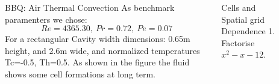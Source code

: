 \documentclass[final]{beamer}
\newlength{\sepwid}
\newlength{\onecolwid}
\newlength{\twocolwid}
\begin{document}
\begin{frame}[t]
\begin{columns}[t]
\begin{column}{\onecolwid}
\end{column} %

\begin{column}{\sepwid}\end{column} %

\begin{column}{\twocolwid} %

\begin{columns}[t,totalwidth=\twocolwid] %

\begin{column}{\onecolwid}\vspace{-.6in} %


\begin{block}{BBQ: Air Thermal Convection}
As benchmark paramenters we chose:
$$Re=4365.30, \: Pr=0.72, \: Pe=0.07$$
For a rectangular Cavity width dimensions: 0.65m height, and 2.6m wide, and normalized temperatures Tc=-0.5, Th=0.5. As shown in the figure the fluid shows some cell formations at long term.
\end{block}


\end{column} %

\begin{column}{\onecolwid}\vspace{-.6in} %


\begin{block}{Cells and Spatial grid Dependence}
1. Factorise $x^2-x-12$.
\end{block}


\end{column} %


\end{columns}
\end{column}
\end{columns}
\end{frame}
\end{document}
